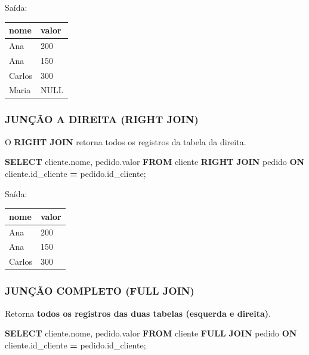 \documentclass[
]{book}
\newenvironment{Shaded}{\begin{snugshade}}{\end{snugshade}}
\newcommand{\KeywordTok}[1]{\textcolor[rgb]{0.13,0.29,0.53}{\textbf{#1}}}
\newcommand{\NormalTok}[1]{#1}
\newcommand{\OperatorTok}[1]{\textcolor[rgb]{0.81,0.36,0.00}{\textbf{#1}}}
\begin{document}
Saída:

\begin{longtable}[]{@{}ll@{}}
\toprule\noalign{}
nome & valor \\
\midrule\noalign{}
\endhead
\bottomrule\noalign{}
\endlastfoot
Ana & 200 \\
Ana & 150 \\
Carlos & 300 \\
Maria & NULL \\
\end{longtable}

\subsubsection{JUNÇÃO A DIREITA (RIGHT JOIN)}\label{junuxe7uxe3o-a-direita-right-join}

O \textbf{RIGHT JOIN} retorna todos os registros da tabela da direita.

\begin{Shaded}
\begin{Highlighting}[]
\KeywordTok{SELECT}\NormalTok{ cliente.nome, pedido.valor}
\KeywordTok{FROM}\NormalTok{ cliente}
\KeywordTok{RIGHT} \KeywordTok{JOIN}\NormalTok{ pedido}
\KeywordTok{ON}\NormalTok{ cliente.id\_cliente }\OperatorTok{=}\NormalTok{ pedido.id\_cliente;}
\end{Highlighting}
\end{Shaded}

Saída:

\begin{longtable}[]{@{}ll@{}}
\toprule\noalign{}
nome & valor \\
\midrule\noalign{}
\endhead
\bottomrule\noalign{}
\endlastfoot
Ana & 200 \\
Ana & 150 \\
Carlos & 300 \\
\end{longtable}

\subsubsection{JUNÇÃO COMPLETO (FULL JOIN)}\label{junuxe7uxe3o-completo-full-join}

Retorna \textbf{todos os registros das duas tabelas (esquerda e direita)}.

\begin{Shaded}
\begin{Highlighting}[]
\KeywordTok{SELECT}\NormalTok{ cliente.nome, pedido.valor}
\KeywordTok{FROM}\NormalTok{ cliente}
\KeywordTok{FULL} \KeywordTok{JOIN}\NormalTok{ pedido}
\KeywordTok{ON}\NormalTok{ cliente.id\_cliente }\OperatorTok{=}\NormalTok{ pedido.id\_cliente;}
\end{Highlighting}
\end{Shaded}
\end{document}
